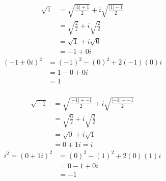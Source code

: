 \documentclass[12pt]{article}
\begin{document}
\begin{multicols}{2}
  \null \vfill
  \begin{align*}
    \sqrt{1} & = \sqrt{\frac{|1| + 1}{2}} + i\sqrt{\frac{|1| - 1}{2}} \\
             & = \sqrt{\frac{2}{2}} + i\sqrt{\frac{2}{2}}             \\
             & = \sqrt{1} + i\sqrt{0}                                 \\
             & = -1 + 0i
  \end{align*}
  \vfill \null
  \columnbreak
  \null \vfill
  \begin{align*}
    (-1 + 0i)^2 & = (-1)^2 - (0)^2 + 2(-1)(0)i \\
                & = 1 - 0 + 0i                 \\
                & = 1                          \\
  \end{align*}
  \vfill \null
\end{multicols}
\begin{multicols}{2}
  \null \vfill
  \begin{align*}
    \sqrt{-1} & = \sqrt{\frac{|-1| + -1}{2}} + i\sqrt{\frac{|-1| - -1}{2}} \\
              & = \sqrt{\frac{0}{2}} + i\sqrt{\frac{2}{2}}                 \\
              & = \sqrt{0} + i\sqrt{1}                                     \\
              & = 0 + 1i = i
  \end{align*}
  \vfill \null
  \columnbreak
  \null \vfill
  \begin{align*}
    i^2 = (0 + 1i)^2 & = (0)^2 - (1)^2 + 2(0)(1)i \\
                     & = 0 - 1 + 0i               \\
                     & = -1
  \end{align*}
  \vfill \null
\end{multicols}
\end{document}

